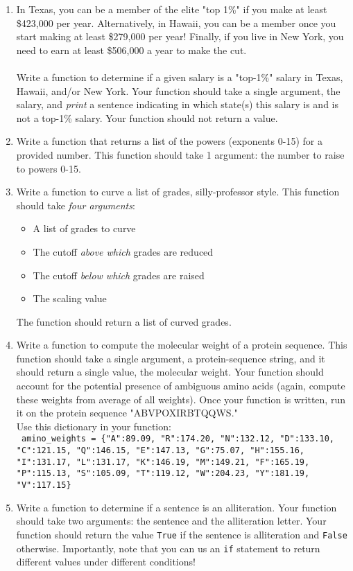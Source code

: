 \documentclass{article}[12pt]
\newcommand{\code}[1]{\texttt{#1}}  %
\begin{document}
\begin{enumerate}[itemsep=5ex]

	\item In Texas, you can be a member of the elite "top 1\%" if you make at least \$423,000 per year. Alternatively, in Hawaii, you can be a member once you start making at least \$279,000 per year! Finally, if you live in New York, you need to earn at least \$506,000 a year to make the cut. \\\\ Write a function to determine if a given salary is a "top-1\%" salary in Texas, Hawaii, and/or New York. Your function should take a single argument, the salary, and \emph{print} a sentence indicating in which state(s) this salary is and is not a top-1\% salary. Your function should not return a value.
	
	
	\item Write a function that returns a list of the powers (exponents 0-15) for a provided number. This function should take 1 argument: the number to raise to powers 0-15.
	
	\item Write a function to curve a list of grades, silly-professor style. This function should take \emph{four arguments}:
	\begin{itemize}
		\item A list of grades to curve
		\item The cutoff \emph{above which} grades are reduced
		\item The cutoff \emph{below which} grades are raised
		\item The scaling value
	\end{itemize}
	The function should return a list of curved grades.
	
	\item Write a function to compute the molecular weight of a protein sequence. This function should take a single argument, a protein-sequence string, and it should return a single value, the molecular weight. Your function should account for the potential presence of ambiguous amino acids (again, compute these weights from average of all weights). Once your function is written, run it on the protein sequence "ABVPOXIRBTQQWS." \\ Use this dictionary in your function:
	\\ \code{ amino\_weights = \{"A":89.09, "R":174.20, "N":132.12, "D":133.10, "C":121.15, "Q":146.15, "E":147.13, "G":75.07, "H":155.16, "I":131.17, "L":131.17, "K":146.19, "M":149.21, "F":165.19, "P":115.13, "S":105.09, "T":119.12, "W":204.23, "Y":181.19, "V":117.15\}} 
	
	\item Write a function to determine if a sentence is an alliteration. Your function should take two arguments: the sentence and the alliteration letter. Your function should return the value \code{True} if the sentence is alliteration and \code{False} otherwise. Importantly, note that you can us an \code{if} statement to return different values under different conditions!
		
\end{enumerate}
\end{document}
